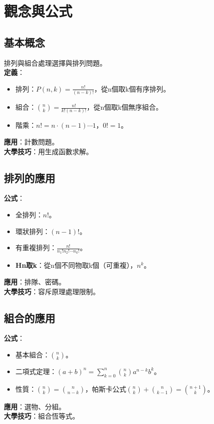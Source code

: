 
\section{觀念與公式}

\subsection{基本概念}
排列與組合處理選擇與排列問題。\\
\textbf{定義}：
\begin{itemize}
    \item 排列：$P(n, k) = \frac{n!}{(n-k)!}$，從n個取k個有序排列。
    \item 組合：$\binom{n}{k} = \frac{n!}{k!(n-k)!}$，從n個取k個無序組合。
    \item 階乘：$n! = n \cdot (n-1) \cdots 1$，$0! = 1$。
\end{itemize}
\textbf{應用}：計數問題。\\
\textbf{大學技巧}：用生成函數求解。

\subsection{排列的應用}
\textbf{公式}：
\begin{itemize}
    \item 全排列：$n!$。
    \item 環狀排列：$(n-1)!$。
    \item 有重複排列：$\frac{n!}{n_1! n_2! \cdots n_k!}$。
    \item \textbf{Hn取k}：從n個不同物取k個（可重複），$n^k$。
\end{itemize}
\textbf{應用}：排隊、密碼。\\
\textbf{大學技巧}：容斥原理處理限制。

\subsection{組合的應用}
\textbf{公式}：
\begin{itemize}
    \item 基本組合：$\binom{n}{k}$。
    \item 二項式定理：$(a + b)^n = \sum_{k=0}^n \binom{n}{k} a^{n-k} b^k$。
    \item 性質：$\binom{n}{k} = \binom{n}{n-k}$，帕斯卡公式$\binom{n}{k} + \binom{n}{k-1} = \binom{n+1}{k}$。
\end{itemize}
\textbf{應用}：選物、分組。\\
\textbf{大學技巧}：組合恆等式。

